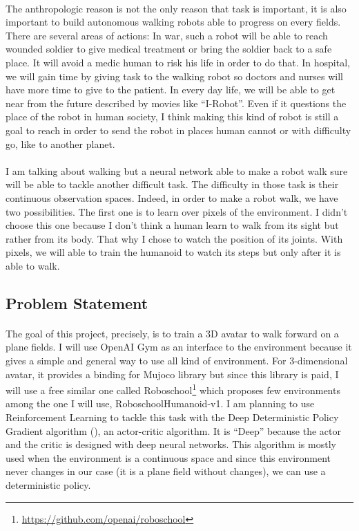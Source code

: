 \documentclass{article}
\begin{document}
\paragraph{}
The anthropologic reason is not the only reason that task is important, it is
also important to build autonomous walking robots able to progress on every
fields. There are several areas of actions: In war, such a robot will be able to
reach wounded soldier to give medical treatment or bring the soldier back to a
safe place. It will avoid a medic human to risk his life in order to do that. In
hospital, we will gain time by giving task to the walking robot so doctors and
nurses will have more time to give to the patient. In every day life, we will be
able to get near from the future described by movies like ``I-Robot''. Even if
it questions the place of the robot in human society, I think making this kind of
robot is still a goal to reach in order to send the robot in places human cannot
or with difficulty go, like to another planet.
\paragraph{}
I am talking about walking but a neural network able to make a robot walk sure
will be able to tackle another difficult task. The difficulty in those task is
their continuous observation spaces. Indeed, in order to make a robot walk, we
have two possibilities. The first one is to learn over pixels of the
environment. I didn't choose this one because I don't think a human learn to
walk from its sight but rather from its body. That why I chose to watch the
position of its joints. With pixels, we will able to train the humanoid to watch
its steps but only after it is able to walk.

\subsection{Problem Statement}
\paragraph{}
The goal of this project, precisely, is to train a 3D avatar to walk forward on
a plane fields. I will use OpenAI Gym \cite{1606.01540} as an interface to the environment
because it gives a simple and general way to use all kind of environment. For
3-dimensional avatar, it provides a binding for Mujoco library but since
this library is paid, I will use a free similar one called
Roboschool\footnote{\href{https://github.com/openai/roboschool}
  {https://github.com/openai/roboschool}} which proposes
few environments among the one I will use, RoboschoolHumanoid-v1. I am planning
to use Reinforcement Learning to tackle this task with the Deep Deterministic
Policy Gradient algorithm (\citeauthor{journals/corr/LillicrapHPHETS15}), an
actor-critic algorithm. It is ``Deep'' because the actor and the critic is
designed with deep neural networks. This algorithm is mostly used when the
environment is a continuous space and since this environment never changes in
our case (it is a plane field without changes), we can use a deterministic policy. 
\end{document}
